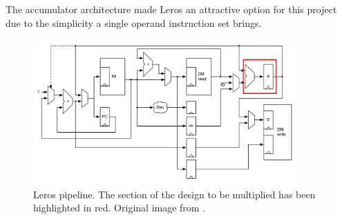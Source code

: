 The accumulator architecture made Leros an attractive option for this project due to 
the simplicity a single operand instruction set brings. 

\begin{figure}[h]
\center
\includegraphics[width=0.9\textwidth]{images/leros-system}
\caption{Leros pipeline. The section of the design to be multiplied has been
highlighted in red. Original image from \cite{schoeberlleros}.
}
\label{fig:leros-system}
\end{figure}
